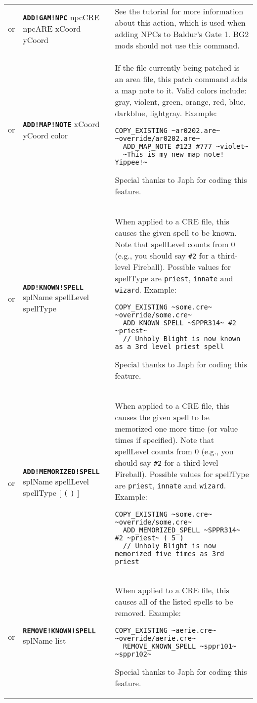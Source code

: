 \documentclass{article}
\def\ttref#1{\ahrefloc{#1}{\tt #1}}
\def\DEFINE#1{{\tt \bf #1}\label{#1}\index{#1}}
\def\DEFSYN#1{{\tt \bf #1}\index{#1}}
\def\t#1{{\tt #1}}
\def\Slist{{\color{red} list }}
\def\Ob{{\color{red} [ }}
\def\Oe{{\color{red} ] }}
\begin{document}
\begin{tabular}{cp{10in}|p{10in}}
  or & \DEFSYN{ADD!GAM!NPC} npcCRE npcARE xCoord yCoord &
    See the \ttref{ADD!GAM!NPC} tutorial for more information about this
    action, which is used when adding NPCs to Baldur's Gate 1. BG2 mods
    should not use this command.  \\

  or & \DEFINE{ADD!MAP!NOTE} xCoord yCoord color \ttref{String} &
    If the file currently being patched is an \ttref{ARE} area file, this
    patch command adds a map note to it. Valid colors include: gray,
    violent, green, orange, red, blue, darkblue, lightgray.
    Example:
\begin{verbatim}
COPY_EXISTING ~ar0202.are~ ~override/ar0202.are~
  ADD_MAP_NOTE #123 #777 ~violet~
  ~This is my new map note!  Yippee!~
\end{verbatim}
    Special thanks to Japh for coding this feature.  \\

or & \DEFINE{ADD!KNOWN!SPELL} splName spellLevel spellType &
  When applied to a CRE file, this \ttref{patch} causes the given spell to
  be known. Note that spellLevel counts from 0 (e.g., you should say
  \t{\#2} for a third-level Fireball). Possible values for spellType are
  \t{priest}, \t{innate} and \t{wizard}. Example:
\begin{verbatim}
COPY_EXISTING ~some.cre~ ~override/some.cre~
  ADD_KNOWN_SPELL ~SPPR314~ #2 ~priest~
  // Unholy Blight is now known as a 3rd level priest spell
\end{verbatim}
  Special thanks to Japh for coding this feature.  \\

or & \DEFINE{ADD!MEMORIZED!SPELL} splName spellLevel spellType
  \Ob \t{(} \ttref{value} \t{)} \Oe&
  When applied to a CRE file, this \ttref{patch} causes the given spell to
  be memorized one more time (or value times if specified).
  Note that spellLevel counts from 0 (e.g., you
  should say \t{\#2} for a third-level Fireball). Possible values for spellType
  are \t{priest}, \t{innate} and \t{wizard}. Example:
\begin{verbatim}
COPY_EXISTING ~some.cre~ ~override/some.cre~
  ADD_MEMORIZED_SPELL ~SPPR314~ #2 ~priest~ ( 5 )
  // Unholy Blight is now memorized five times as 3rd priest
\end{verbatim} \\

or & \DEFINE{REMOVE!KNOWN!SPELL} splName \Slist &
  When applied to a CRE file, this \ttref{patch} causes all of the
  listed spells to be removed. Example:
\begin{verbatim}
COPY_EXISTING ~aerie.cre~ ~override/aerie.cre~
  REMOVE_KNOWN_SPELL ~sppr101~ ~sppr102~
\end{verbatim}
  Special thanks to Japh for coding this feature.  \\


\end{tabular}
\end{document}
